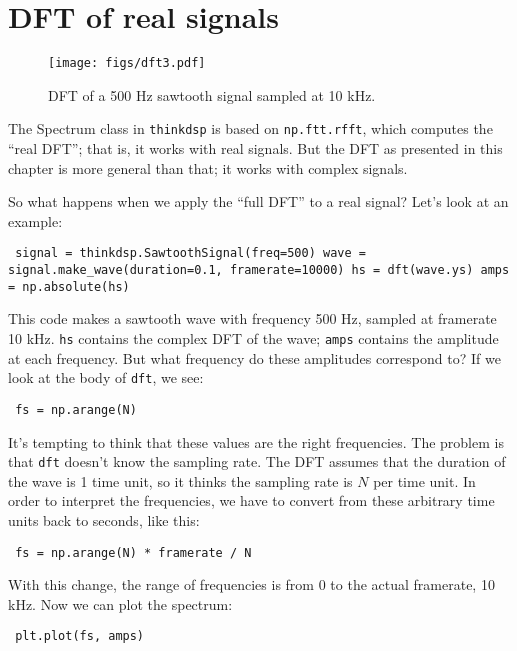 \documentclass[12pt]{book} \usepackage[width=5.5in,height=8.5in, hmarginratio=3:2,vmarginratio=1:1]{geometry}
\begin{document}
\section{DFT of real signals} 

\begin{figure} 

\centerline{\texttt{[image: figs/dft3.pdf]}} \caption{DFT of a 500 Hz sawtooth signal sampled at 10 kHz.} \label{fig.dft3} \end{figure} 

The Spectrum class in {\tt thinkdsp} is based on {\tt np.ftt.rfft}, which computes the ``real DFT''; that is, it works with real signals. But the DFT as presented in this chapter is more general than that; it works with complex signals. 

So what happens when we apply the ``full DFT'' to a real signal? Let's look at an example: 

\begin{verbatim} signal = thinkdsp.SawtoothSignal(freq=500) wave = signal.make_wave(duration=0.1, framerate=10000) hs = dft(wave.ys) amps = np.absolute(hs) \end{verbatim} 

This code makes a sawtooth wave with frequency 500 Hz, sampled at framerate 10 kHz. {\tt hs} contains the complex DFT of the wave; {\tt amps} contains the amplitude at each frequency. But what frequency do these amplitudes correspond to? If we look at the body of {\tt dft}, we see: 

\begin{verbatim} fs = np.arange(N) \end{verbatim} 

It's tempting to think that these values are the right frequencies. The problem is that {\tt dft} doesn't know the sampling rate. The DFT assumes that the duration of the wave is 1 time unit, so it thinks the sampling rate is $N$ per time unit. In order to interpret the frequencies, we have to convert from these arbitrary time units back to seconds, like this: 

\begin{verbatim} fs = np.arange(N) * framerate / N \end{verbatim} 

With this change, the range of frequencies is from 0 to the actual framerate, 10 kHz. Now we can plot the spectrum: 

\begin{verbatim} plt.plot(fs, amps) \end{verbatim} 
\end{document}
